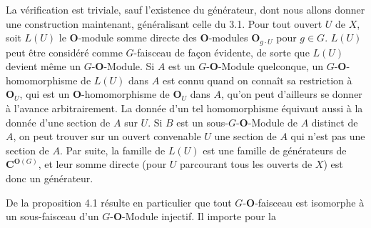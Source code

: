 La vérification est triviale, sauf l'existence du générateur, dont nous allons
donner une construction maintenant, généralisant celle du 3.1.
Pour tout ouvert $U$ de $X$, soit $L(U)$ le ${\mathbf O}$-module somme directe des
${\mathbf O}$-modules ${\mathbf O}_{g\cdot U}$ pour $g\in G$. $L(U)$ peut être considéré comme
$G$-faisceau de façon évidente, de sorte que $L(U)$ devient même un
$G$-${\mathbf O}$-Module. Si $A$ est un $G$-${\mathbf O}$-Module quelconque, un
$G$-${\mathbf O}$-homomorphisme de $L(U)$ dans $A$ est connu quand on connaît sa
restriction à ${\mathbf O}_U$, qui est un ${\mathbf O}$-homomorphisme de ${\mathbf O}_U$ dans $A$, qu'on
peut d'ailleurs se donner à l'avance arbitrairement. La donnée d'un tel
homomorphisme équivaut aussi à la donnée d'une section de $A$ sur $U$.
Si $B$ est un sous-$G$-${\mathbf O}$-Module de $A$ distinct de $A$, on peut trouver sur
un ouvert convenable $U$ une section de $A$ qui n'est pas une section de $A$.
Par suite, la famille de $L(U)$ est une famille de générateurs de ${\mathbf C}^{{\mathbf O}(G)}$,
et leur somme directe (pour $U$ parcourant tous les ouverts de $X$) est donc
un générateur.

De la proposition 4.1 résulte en particulier que tout $G$-${\mathbf O}$-faisceau est
isomorphe à un sous-faisceau d'un $G$-${\mathbf O}$-Module injectif. Il importe pour la


